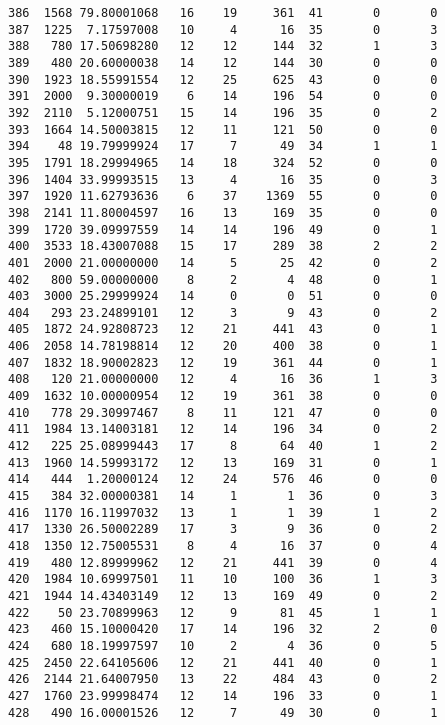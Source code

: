 \documentclass[
  letterpaper,
  DIV=11,
  numbers=noendperiod]{scrreprt}
\begin{document}
\begin{verbatim}
386  1568 79.80001068   16    19     361  41       0       0
387  1225  7.17597008   10     4      16  35       0       3
388   780 17.50698280   12    12     144  32       1       3
389   480 20.60000038   14    12     144  30       0       0
390  1923 18.55991554   12    25     625  43       0       0
391  2000  9.30000019    6    14     196  54       0       0
392  2110  5.12000751   15    14     196  35       0       2
393  1664 14.50003815   12    11     121  50       0       0
394    48 19.79999924   17     7      49  34       1       1
395  1791 18.29994965   14    18     324  52       0       0
396  1404 33.99993515   13     4      16  35       0       3
397  1920 11.62793636    6    37    1369  55       0       0
398  2141 11.80004597   16    13     169  35       0       0
399  1720 39.09997559   14    14     196  49       0       1
400  3533 18.43007088   15    17     289  38       2       2
401  2000 21.00000000   14     5      25  42       0       2
402   800 59.00000000    8     2       4  48       0       1
403  3000 25.29999924   14     0       0  51       0       0
404   293 23.24899101   12     3       9  43       0       2
405  1872 24.92808723   12    21     441  43       0       1
406  2058 14.78198814   12    20     400  38       0       1
407  1832 18.90002823   12    19     361  44       0       1
408   120 21.00000000   12     4      16  36       1       3
409  1632 10.00000954   12    19     361  38       0       0
410   778 29.30997467    8    11     121  47       0       0
411  1984 13.14003181   12    14     196  34       0       2
412   225 25.08999443   17     8      64  40       1       2
413  1960 14.59993172   12    13     169  31       0       1
414   444  1.20000124   12    24     576  46       0       0
415   384 32.00000381   14     1       1  36       0       3
416  1170 16.11997032   13     1       1  39       1       2
417  1330 26.50002289   17     3       9  36       0       2
418  1350 12.75005531    8     4      16  37       0       4
419   480 12.89999962   12    21     441  39       0       4
420  1984 10.69997501   11    10     100  36       1       3
421  1944 14.43403149   12    13     169  49       0       2
422    50 23.70899963   12     9      81  45       1       1
423   460 15.10000420   17    14     196  32       2       0
424   680 18.19997597   10     2       4  36       0       5
425  2450 22.64105606   12    21     441  40       0       1
426  2144 21.64007950   13    22     484  43       0       2
427  1760 23.99998474   12    14     196  33       0       1
428   490 16.00001526   12     7      49  30       0       1

\end{verbatim}
\end{document}
